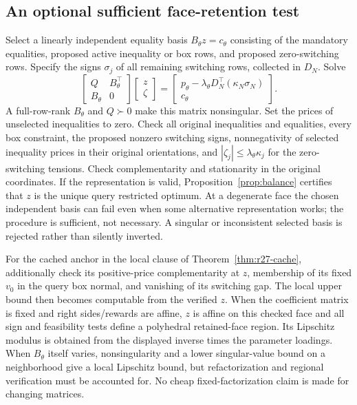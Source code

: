 \subsection{An optional sufficient face-retention test}
Select a linearly independent equality basis $B_\theta z=c_\theta$ consisting of the mandatory equalities, proposed active inequality or box rows, and proposed zero-switching rows. Specify the signs $\sigma_j$ of all remaining switching rows, collected in $D_N$. Solve
\begin{equation}\label{eq:faceKKT}
 \begin{bmatrix}Q&B_\theta^\top\\B_\theta&0\end{bmatrix}
 \begin{bmatrix}z\\\zeta\end{bmatrix}
 =\begin{bmatrix}p_\theta-\lambda_\theta D_N^\top(\kappa_N\sigma_N)\\c_\theta\end{bmatrix}.
\end{equation}
A full-row-rank $B_\theta$ and $Q\succ0$ make this matrix nonsingular. Set the prices of unselected inequalities to zero. Check all original inequalities and equalities, every box constraint, the proposed nonzero switching signs, nonnegativity of selected inequality prices in their original orientations, and $|\zeta_j|\leq\lambda_\theta\kappa_j$ for the zero-switching tensions. Check complementarity and stationarity in the original coordinates. If the representation is valid, Proposition~\ref{prop:balance} certifies that $z$ is the unique query restricted optimum. At a degenerate face the chosen independent basis can fail even when some alternative representation works; the procedure is sufficient, not necessary. A singular or inconsistent selected basis is rejected rather than silently inverted.

For the cached anchor in the local clause of Theorem~\ref{thm:r27-cache}, additionally check its positive-price complementarity at $z$, membership of its fixed $v_0$ in the query box normal, and vanishing of its switching gap. The local upper bound then becomes computable from the verified $z$. When the coefficient matrix is fixed and right sides/rewards are affine, $z$ is affine on this checked face and all sign and feasibility tests define a polyhedral retained-face region. Its Lipschitz modulus is obtained from the displayed inverse times the parameter loadings. When $B_\theta$ itself varies, nonsingularity and a lower singular-value bound on a neighborhood give a local Lipschitz bound, but refactorization and regional verification must be accounted for. No cheap fixed-factorization claim is made for changing matrices.

